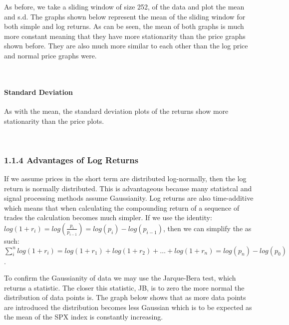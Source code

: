\documentclass[11pt]{article}
\begin{document}
As before, we take a sliding window of size 252, of the data and plot
the mean and s.d. The graphs shown below represent the mean of the
sliding window for both simple and log returns. As can be seen, the mean
of both graphs is much more constant meaning that they have more
stationarity than the price graphs shown before. They are also much more
similar to each other than the log price and normal price graphs were.

    \begin{center}
    \end{center}
    { \hspace*{\fill} \\}
    
    \hypertarget{standard-deviation}{%
\paragraph{Standard Deviation}\label{standard-deviation}}

As with the mean, the standard deviation plots of the returns show more
stationarity than the price plots.

    \begin{center}
    \end{center}
    { \hspace*{\fill} \\}
    
    \hypertarget{advantages-of-log-returns}{%
\subsubsection{1.1.4 Advantages of Log
Returns}\label{advantages-of-log-returns}}

If we assume prices in the short term are distributed log-normally, then
the log return is normally distributed. This is advantageous because
many statistcal and signal processing methods assume Gaussianity. Log
returns are also time-additive which means that when calculating the
compounding return of a sequence of trades the calculation becomes much
simpler. If we use the identity: $ log(1+r_i) = log(\frac{p_i}{p_{i-1}}) = log(p_i) - log(p_{i-1})$, 
then we can
simplify the as such: 
$\sum_i^n log(1+r_i) = log(1+r_1) + log(1+r_2) + \ldots{} + log(1+r_n) = log(p_n) - log(p_0) $.

To confirm the Gaussianity of data we may use the Jarque-Bera test,
which returns a statistic. The closer this statistic, JB, is to zero the
more normal the distribution of data points is. The graph below shows
that as more data points are introduced the distribution becomes less
Gaussian which is to be expected as the mean of the SPX index is
constantly increasing.
\end{document}
